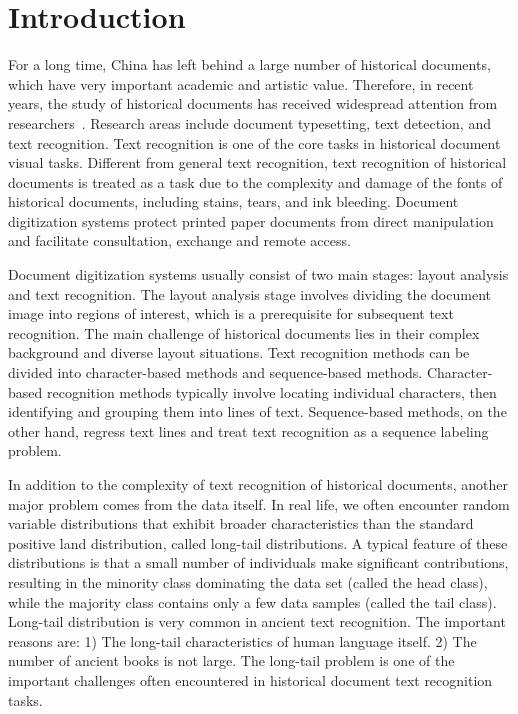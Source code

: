 
\section{Introduction}

For a long time, China has left behind a large number of historical documents, which have very important academic and artistic value. 
Therefore, in recent years, the study of historical documents has received widespread attention from researchers~\cite{}. 
Research areas include document typesetting, text detection, and text recognition. Text recognition is one of the core tasks in historical document visual tasks. Different from general text recognition, text recognition of historical documents is treated as a task due to the complexity and damage of the fonts of historical documents, including stains, tears, and ink bleeding. Document digitization systems protect printed paper documents from direct manipulation and facilitate consultation, exchange and remote access.

Document digitization systems usually consist of two main stages: layout analysis and text recognition. The layout analysis stage involves dividing the document image into regions of interest, which is a prerequisite for subsequent text recognition. The main challenge of historical documents lies in their complex background and diverse layout situations. Text recognition methods can be divided into character-based methods and sequence-based methods. Character-based recognition methods typically involve locating individual characters, then identifying and grouping them into lines of text. Sequence-based methods, on the other hand, regress text lines and treat text recognition as a sequence labeling problem.


In addition to the complexity of text recognition of historical documents, another major problem comes from the data itself. In real life, we often encounter random variable distributions that exhibit broader characteristics than the standard positive land distribution, called long-tail distributions. A typical feature of these distributions is that a small number of individuals make significant contributions, resulting in the minority class dominating the data set (called the head class), while the majority class contains only a few data samples (called the tail class). Long-tail distribution is very common in ancient text recognition. The important reasons are: 1) The long-tail characteristics of human language itself. 2) The number of ancient books is not large. The long-tail problem is one of the important challenges often encountered in historical document text recognition tasks.

